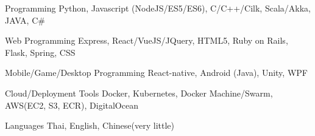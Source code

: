 

\begin{cvskills}

  \cvskill
    {Programming} %
    {Python, Javascript (NodeJS/ES5/ES6), C/C++/Cilk, Scala/Akka, JAVA, C\#} %

  \cvskill
    {Web Programming} %
    {Express, React/VueJS/JQuery, HTML5, Ruby on Rails, Flask, Spring, CSS} %

  \cvskill
    {Mobile/Game/Desktop Programming} %
    {React-native, Android (Java), Unity, WPF} %

  \cvskill
    {Cloud/Deployment Tools} %
    {Docker, Kubernetes, Docker Machine/Swarm, AWS(EC2, S3, ECR), DigitalOcean} %

  \cvskill
    {Languages} %
    {Thai, English, Chinese(very little)} %

\end{cvskills}
